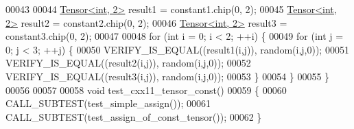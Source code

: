 \begin{DoxyCode}
00043 
00044   \hyperlink{class_eigen_1_1_tensor}{Tensor<int, 2>} result1 = constant1.chip(0, 2);
00045   \hyperlink{class_eigen_1_1_tensor}{Tensor<int, 2>} result2 = constant2.chip(0, 2);
00046   \hyperlink{class_eigen_1_1_tensor}{Tensor<int, 2>} result3 = constant3.chip(0, 2);
00047 
00048   \textcolor{keywordflow}{for} (\textcolor{keywordtype}{int} i = 0; i < 2; ++i) \{
00049     \textcolor{keywordflow}{for} (\textcolor{keywordtype}{int} j = 0; j < 3; ++j) \{
00050       VERIFY\_IS\_EQUAL((result1(i,j)), random(i,j,0));
00051       VERIFY\_IS\_EQUAL((result2(i,j)), random(i,j,0));
00052       VERIFY\_IS\_EQUAL((result3(i,j)), random(i,j,0));
00053     \}
00054   \}
00055 \}
00056 
00057 
00058 \textcolor{keywordtype}{void} test\_cxx11\_tensor\_const()
00059 \{
00060   CALL\_SUBTEST(test\_simple\_assign());
00061   CALL\_SUBTEST(test\_assign\_of\_const\_tensor());
00062 \}
\end{DoxyCode}
